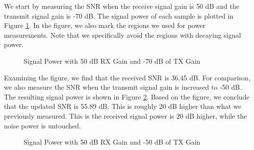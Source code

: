 \documentclass{article}
\begin{document}
We start by measuring the SNR when the receive signal gain is 50 dB and the transmit signal gain is -70 dB. The signal power of each sample is plotted in Figure \ref{fig::snr_manual_agc_50db_rx_gain_70db_tx_atten}. In the figure, we also mark the regions we used for power measurements. Note that we specifically avoid the regions with decaying signal power.

\begin{figure}[H]
	\centerline{}
	\caption{Signal Power with 50 dB RX Gain and -70 dB of TX Gain}
	\label{fig::snr_manual_agc_50db_rx_gain_70db_tx_atten}
\end{figure}

Examining the figure, we find that the received SNR is 36.45 dB. For comparison, we also measure the SNR when the transmit signal gain is increased to -50 dB. The resulting signal power is shown in Figure \ref{fig::snr_manual_agc_50db_rx_gain_50db_tx_atten}. Based on the figure, we conclude that the updated SNR is 55.89 dB. This is roughly 20 dB higher than what we previously measured. This is the received signal power is 20 dB higher, while the noise power is untouched.

\begin{figure}[H]
	\centerline{}
	\caption{Signal Power with 50 dB RX Gain and -50 dB of TX Gain}
	\label{fig::snr_manual_agc_50db_rx_gain_50db_tx_atten}
\end{figure}
\end{document}
